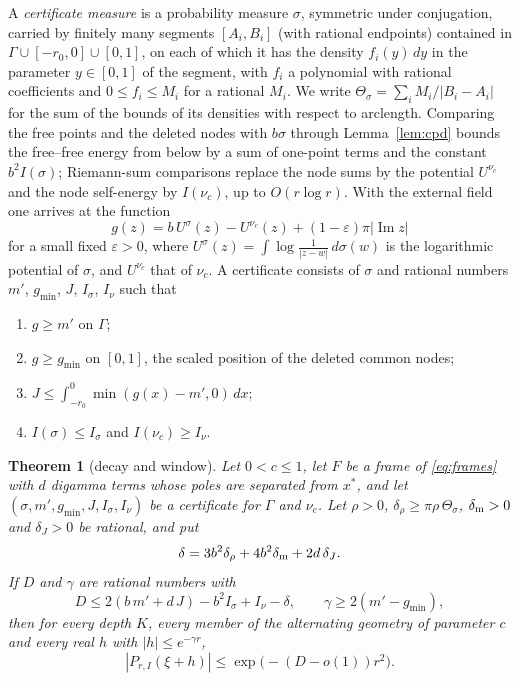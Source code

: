 \documentclass[11pt]{amsart}
\newtheorem{theorem}{Theorem}[section]
\theoremstyle{definition}
\theoremstyle{remark}
\numberwithin{equation}{section}
\renewcommand{\Im}{\operatorname{Im}}
\begin{document}
A \emph{certificate measure} is a probability measure $\sigma$, symmetric under conjugation, carried by finitely many
segments $[A_i,B_i]$ (with rational endpoints) contained in $\Gamma\cup[-r_0,0]\cup[0,1]$, on each of which it has the
density $f_i(y)\,dy$ in the parameter $y\in[0,1]$ of the segment, with $f_i$ a polynomial with rational coefficients and
$0\le f_i\le M_i$ for a rational $M_i$. We write $\Theta_\sigma=\sum_iM_i/|B_i-A_i|$ for the sum of the bounds of its densities
with respect to arclength. Comparing the free points and the deleted nodes with $b\sigma$ through
Lemma~\ref{lem:cpd} bounds the free--free energy from below by a sum of one-point terms and the constant $b^2I(\sigma)$;
Riemann-sum comparisons replace the node sums by the potential $U^{\nu_c}$ and the node self-energy by $I(\nu_c)$, up to
$O(r\log r)$. With the external field one arrives at the function
\[
 g(z)=b\,U^\sigma(z)-U^{\nu_c}(z)+(1-\varepsilon)\pi|\Im z|
\]
for a small fixed $\varepsilon>0$, where $U^\sigma(z)=\int\log\frac1{|z-w|}\,d\sigma(w)$ is the logarithmic potential of
$\sigma$, and $U^{\nu_c}$ that of $\nu_c$. A certificate consists of $\sigma$ and
rational numbers $m'$, $g_{\min}$, $J$, $I_\sigma$, $I_\nu$ such that
\begin{enumerate}[label=(\alph*),leftmargin=*]
\item $g\ge m'$ on $\Gamma$;
\item $g\ge g_{\min}$ on $[0,1]$, the scaled position of the deleted common nodes;
\item $J\le\int_{-r_0}^0\min(g(x)-m',0)\,dx$;
\item $I(\sigma)\le I_\sigma$ and $I(\nu_c)\ge I_\nu$.
\end{enumerate}

\begin{theorem}[decay and window]\label{thm:decay}
Let $0<c\le1$, let $F$ be a frame of \eqref{eq:frames} with $d$ digamma terms whose poles are separated from $x^*$, and let
$(\sigma,m',g_{\min},J,I_\sigma,I_\nu)$ be a certificate for $\Gamma$ and $\nu_c$. Let $\rho>0$, $\delta_\rho\ge\pi\rho\,\Theta_\sigma$,
$\delta_{\rm m}>0$ and $\delta_J>0$ be rational, and put
\[
 \delta=3b^2\delta_\rho+4b^2\delta_{\rm m}+2d\,\delta_J .
\]
If $D$ and $\gamma$ are rational numbers with
\[
 D\le2(b\,m'+d\,J)-b^2I_\sigma+I_\nu-\delta,\qquad \gamma\ge2(m'-g_{\min}),
\]
then for every depth $K$, every member of the alternating geometry of parameter $c$ and every real $h$ with
$|h|\le e^{-\gamma r}$,
\[
 |P_{r,I}(\xi+h)|\le\exp\bigl(-(D-o(1))r^2\bigr).
\]
\end{theorem}
\end{document}
